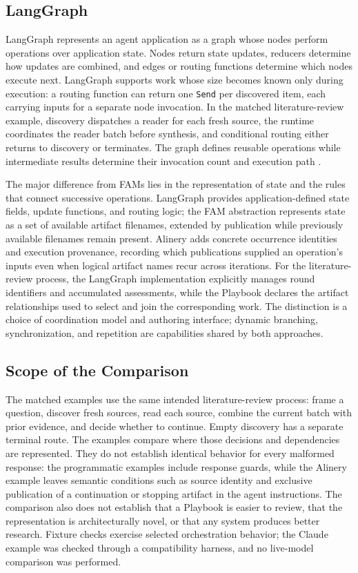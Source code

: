 \documentclass[letterpaper]{article}
\theoremstyle{definition}
\begin{document}
\subsection{LangGraph}

LangGraph represents an agent application as a graph whose nodes perform
operations over application state. Nodes return state updates, reducers
determine how updates are combined, and edges or routing functions determine
which nodes execute next. LangGraph supports work whose size becomes known
only during execution: a routing function can return one \texttt{Send} per
discovered item, each carrying inputs for a separate node invocation. In the
matched literature-review example, discovery dispatches a reader for each
fresh source, the runtime coordinates the reader batch before synthesis, and
conditional routing either returns to discovery or terminates. The graph
defines reusable operations while intermediate results determine their
invocation count and execution path
\cite{langchain2026graphapi,langchain2026pregel}.

The major difference from FAMs lies in the representation of state and the
rules that connect successive operations. LangGraph provides
application-defined state fields, update functions, and routing logic; the
FAM abstraction represents state as a set of available artifact filenames,
extended by publication while previously available filenames remain present.
Alinery adds concrete occurrence identities and execution provenance,
recording which publications supplied an operation's inputs even when logical
artifact names recur across iterations. For the literature-review process,
the LangGraph implementation explicitly manages round identifiers and
accumulated assessments, while the Playbook declares the artifact
relationships used to select and join the corresponding work. The distinction
is a choice of coordination model and authoring interface; dynamic branching,
synchronization, and repetition are capabilities shared by both approaches.

\subsection{Scope of the Comparison}

The matched examples use the same intended literature-review process:
frame a question, discover fresh sources, read each source, combine the
current batch with prior evidence, and decide whether to continue. Empty
discovery has a separate terminal route. The examples compare where those
decisions and dependencies are represented. They do not establish identical
behavior for every malformed response: the programmatic examples include
response guards, while the Alinery example leaves semantic conditions such as
source identity and exclusive publication of a continuation or stopping
artifact in the agent instructions. The comparison also does not establish
that a Playbook is easier to review, that the representation is architecturally
novel, or that any system produces better research. Fixture checks exercise
selected orchestration behavior; the Claude example was checked through a
compatibility harness, and no live-model comparison was performed.
\end{document}
